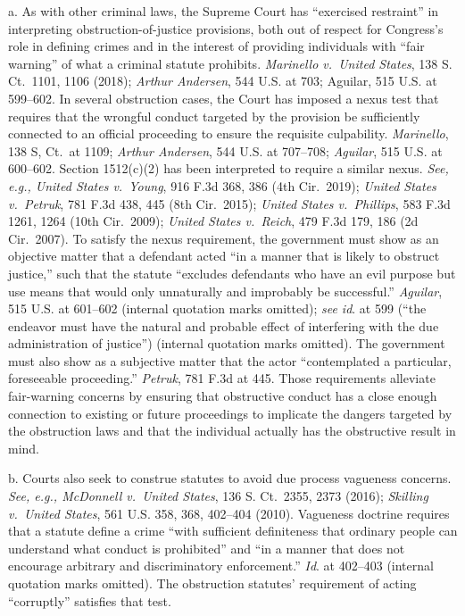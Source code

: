 a. As with other criminal laws, the Supreme Court has “exercised restraint” in interpreting obstruction-of-justice provisions, both out of respect for Congress’s role in defining crimes and in the interest of providing individuals with “fair warning” of what a criminal statute prohibits.
\textit{Marinello v.\ United States}, 138 S. Ct.~1101, 1106 (2018);
\textit{Arthur Andersen}, 544 U.S. at 703; Aguilar, 515 U.S. at 599--602.
In several obstruction cases, the Court has imposed a nexus test that requires that the wrongful conduct targeted by the provision be sufficiently connected to an official proceeding to ensure the requisite culpability.
\textit{Marinello}, 138 S, Ct.~at 1109;
\textit{Arthur Andersen}, 544 U.S. at 707--708;
\textit{Aguilar}, 515 U.S. at 600--602.
Section 1512(c)(2) has been interpreted to require a similar nexus.
\textit{See, e.g., United States v.\ Young}, 916 F.3d 368, 386 (4th Cir.~2019);
\textit{United States v.\ Petruk}, 781 F.3d 438, 445 (8th Cir.~2015);
\textit{United States v.\ Phillips}, 583 F.3d 1261, 1264 (10th Cir.~2009);
\textit{United States v.\ Reich}, 479 F.3d 179, 186 (2d Cir.~2007).
To satisfy the nexus requirement, the government must show as an objective matter that a defendant acted “in a manner that is likely to obstruct justice,” such that the statute “excludes defendants who have an evil purpose but use means that would only unnaturally and improbably be successful.”
\textit{Aguilar}, 515 U.S. at 601--602 (internal quotation marks omitted);
\textit{see id}. at 599 (“the endeavor must have the natural and probable effect of interfering with the due administration of justice”) (internal quotation marks omitted).
The government must also show as a subjective matter that the actor “contemplated a particular, foreseeable proceeding.”
\textit{Petruk}, 781 F.3d at 445.
Those requirements alleviate fair-warning concerns by ensuring that obstructive conduct has a close enough connection to existing or future proceedings to implicate the dangers targeted by the obstruction laws and that the individual actually has the obstructive result in mind.

b. Courts also seek to construe statutes to avoid due process vagueness concerns.
\textit{See, e.g., McDonnell v.\ United States}, 136 S. Ct.~2355, 2373 (2016);
\textit{Skilling v.\ United States}, 561 U.S. 358, 368, 402--404 (2010).
Vagueness doctrine requires that a statute define a crime “with sufficient definiteness that ordinary people can understand what conduct is prohibited” and “in a manner that does not encourage arbitrary and discriminatory enforcement.”
\textit{Id}. at 402--403 (internal quotation marks omitted).
The obstruction statutes’ requirement of acting “corruptly” satisfies that test.

